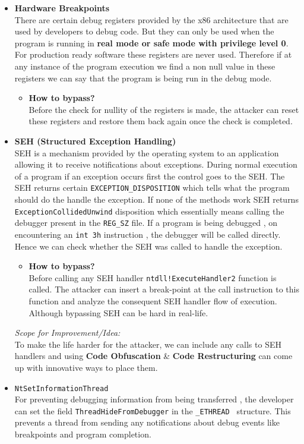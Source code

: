 \documentclass[11pt]{article}
\begin{document}
\begin{itemize}
    \item{\textbf{Hardware Breakpoints}\\There are certain debug registers provided by the x86 architecture that are used by developers to debug code. But they can only be used when the program is running in \textbf{real mode or safe mode with privilege level 0}. For production ready software these registers are never used. Therefore if at any instance of the program execution we find a non null value in these registers we can say that the program is being run in the debug mode.}
    
    \begin{itemize}
            \item{\textbf{How to bypass?}\\ Before the check for nullity of the registers is made, the attacker can reset these registers and restore them back again once the check is completed.}
    \end{itemize}

    \item{\textbf{SEH (Structured Exception Handling)}\\SEH is a mechanism provided by the operating system to an application allowing it to receive notifications about exceptions. During normal execution of a program if an exception occurs first the control goes to the SEH. The SEH returns certain \texttt{EXCEPTION\_DISPOSITION} which tells what the program should do the handle the exception. If none of the methods work SEH returns \texttt{ExceptionCollidedUnwind} disposition which essentially means calling the debugger present in the \texttt{REG\_SZ} file. If a program is being debugged , on encountering an \texttt{int 3h} instruction , the debugger will be called directly. Hence we can check whether the SEH was called to handle the exception.
    
     \begin{itemize}
            \item{\textbf{How to bypass?}\\ Before calling any SEH handler \texttt{ntdll!ExecuteHandler2} function is called. The attacker can insert a break-point at the call instruction to this function and analyze the consequent SEH handler flow of execution. Although bypassing SEH can be hard in real-life.}
    \end{itemize}
    
    \textit{Scope for Improvement/Idea:}\\To make the life harder for the attacker, we can include any calls to SEH handlers and using \textbf{Code Obfuscation} \& \textbf{Code Restructuring} can come up with innovative ways to place them.
    }
    \item{\texttt{NtSetInformationThread}\\For preventing debugging information from being transferred , the developer can set the field \texttt{ThreadHideFromDebugger} in the \texttt{\_ETHREAD } structure. This prevents a thread from sending any notifications about debug events like breakpoints and program completion.}
\end{itemize}
\end{document}
